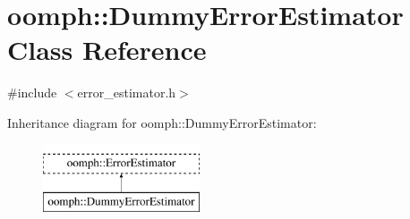 \hypertarget{classoomph_1_1DummyErrorEstimator}{}\section{oomph\+:\+:Dummy\+Error\+Estimator Class Reference}
\label{classoomph_1_1DummyErrorEstimator}


{\ttfamily \#include $<$error\+\_\+estimator.\+h$>$}

Inheritance diagram for oomph\+:\+:Dummy\+Error\+Estimator\+:\begin{figure}[H]
\begin{center}
\leavevmode
\includegraphics[height=2.000000cm]{classoomph_1_1DummyErrorEstimator}
\end{center}
\end{figure}
